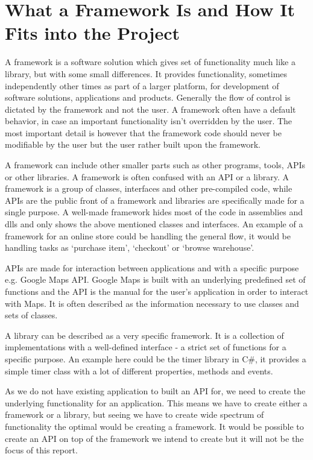\section{What a Framework Is and How It Fits into the Project}

A framework is a software solution which gives set of functionality much like a library, but with some small differences. It provides functionality, sometimes independently other times as part of a larger platform, for development of software solutions, applications and products.
Generally the flow of control is dictated by the framework and not the user. A framework often have a default behavior, in case an important functionality isn't overridden by the user. The most important detail is however that the framework code should never be modifiable by the user but the user rather built upon the framework. \cite{framework}

A framework can include other smaller parts such as other programs, tools, APIs or other libraries. A framework is often confused with an API or a library. A framework is a group of classes, interfaces and other pre-compiled code, while APIs are the public front of a framework and libraries are specifically made for a single purpose. A well-made framework hides most of the code in assemblies and dlls and only shows the above mentioned classes and interfaces. An example of a framework for an online store could be handling the general flow, it would be handling tasks as `purchase item', `checkout' or `browse warehouse'.

APIs are made for interaction between applications and with a specific purpose e.g. Google Maps API. Google Maps is built with an underlying predefined set of functions and the API is the manual for the user's application in order to interact with Maps. It is often described as the information necessary to use classes and sets of classes.

A library can be described as a very specific framework. It is a collection of implementations with a well-defined interface - a strict set of functions for a specific purpose. An example here could be the timer library in C\#, it provides a simple timer class with a lot of different properties, methods and events.

As we do not have existing application to built an API for, we need to create the underlying functionality for an application. This means we have to create either a framework or a library, but seeing we have to create wide spectrum of functionality the optimal would be creating a framework. It would be possible to create an API on top of the framework we intend to create but it will not be the focus of this report.